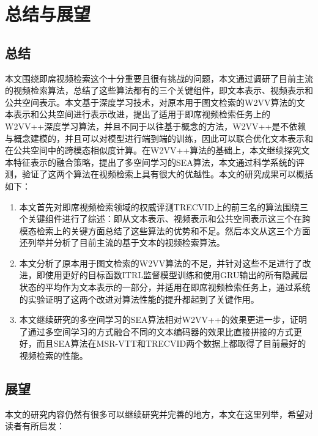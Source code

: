 \chapter{总结与展望}

\section{总结}
    本文围绕即席视频检索这个十分重要且很有挑战的问题，本文通过调研了目前主流的视频检索算法，总结了这些算法都有的三个关键组件，即文本表示、视频表示和公共空间表示。本文基于深度学习技术，对原本用于图文检索的W2VV算法的文本表示和公共空间进行表示改进，提出了适用于即席视频检索任务上的W2VV++深度学习算法，并且不同于以往基于概念的方法，W2VV++是不依赖与概念建模的，并且可以对模型进行端到端的训练，因此可以联合优化文本表示和在公共空间中的跨模态相似度计算。在W2VV++算法的基础上，本文继续探究文本特征表示的融合策略，提出了多空间学习的SEA算法，本文通过科学系统的评测，验证了这两个算法在视频检索上具有很大的优越性。本文的研究成果可以概括如下：
    \begin{enumerate}[\hspace{2em}1.]
        \item 本文首先对即席视频检索领域的权威评测TRECVID上的前三名的算法围绕三个关键组件进行了综述：即从文本表示、视频表示和公共空间表示这三个在跨模态检索上的关键方面总结了这些算法的优势和不足。然后本文从这三个方面还列举并分析了目前主流的基于文本的视频检索算法。
        \item 本文分析了原本用于图文检索的W2VV算法的不足，并针对这些不足进行了改进，即使用更好的目标函数ITRL监督模型训练和使用GRU输出的所有隐藏层状态的平均作为文本表示的一部分，并适用在即席视频检索任务上，通过系统的实验证明了这两个改进对算法性能的提升都起到了关键作用。
        \item 本文继续研究的多空间学习的SEA算法相对W2VV++的效果更进一步，证明了通过多空间学习的方式融合不同的文本编码器的效果比直接拼接的方式更好，而且SEA算法在MSR-VTT和TRECVID两个数据上都取得了目前最好的视频检索的性能。

    \end{enumerate}


\section{展望}
    本文的研究内容仍然有很多可以继续研究并完善的地方，本文在这里列举，希望对读者有所启发：

